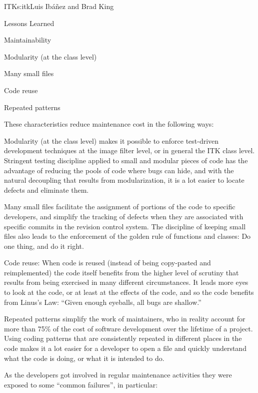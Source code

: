 \begin{aosachapter}{ITK}{s:itk}{Luis Ib\'{a}\~{n}ez and Brad King}
\begin{aosasect1}{Lessons Learned}
\begin{aosasect2}{Maintainability}
\begin{aosaitemize}
\item Modularity (at the class level)
\item Many small files 
\item Code reuse
\item Repeated patterns
\end{aosaitemize}

\end{aosasect2}

\noindent These characteristics reduce maintenance cost in the following ways:

\begin{aosaitemize}
\item Modularity (at the class level) makes it possible to enforce test-driven 
development techniques at the image filter level, or in general
the ITK class level. Stringent testing discipline applied to small
and modular pieces of code has the advantage of reducing the pools of
code where bugs can hide, and with the natural decoupling that results
from modularization, it is a lot easier to locate defects and
eliminate them.
\item Many small files facilitate the assignment of portions of the
code to specific developers, and simplify the tracking of defects when
they are associated with specific commits in the revision control
system. The discipline of keeping small files also leads to the
enforcement of the golden rule of functions and classes: Do one
thing, and do it right.
\item Code reuse: When code is reused (instead of being copy-pasted
and reimplemented) the code itself benefits from the higher level of
scrutiny that results from being exercised in many different
circumstances. It leads more eyes to look at the code, or
at least at the effects of the code, and so the code benefits from Linus's Law:
``Given enough eyeballs, all bugs are shallow.''
\item Repeated patterns simplify the work of maintainers, who in reality 
account for more than 75\% of the cost of
software development over the lifetime of a project. Using
coding patterns that are consistently repeated in different places in
the code makes it a lot easier for a developer to open a file and
quickly understand what the code is doing, or
what it is intended to do.
\end{aosaitemize}

As the developers got involved in regular maintenance activities they
were exposed to some ``common failures'', in particular:


\end{aosasect1}
\end{aosachapter}
